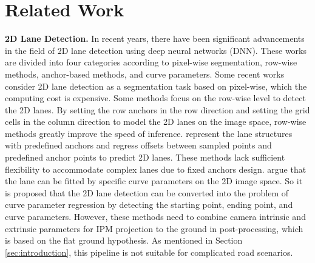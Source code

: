 \documentclass[10pt,twocolumn,letterpaper]{article}
\begin{document}
\section{Related Work} \label{sec:related}



\textbf{2D Lane Detection.}
In recent years, there have been significant advancements in the field of 2D lane detection using deep neural networks (DNN). These works are divided into four categories according to pixel-wise segmentation, row-wise methods, anchor-based methods, and curve parameters. Some recent works \cite{pan2018spatial,zheng2021resa,li2021hdmapnet,neven2018towards} consider 2D lane detection as a segmentation task based on pixel-wise, which the computing cost is expensive. Some methods \cite{qin2020ultra,liu2021condlanenet,yoo2020end} focus on the row-wise level to detect the 2D lanes. By setting the row anchors in the row direction and setting the grid cells in the column direction to model the 2D lanes on the image space, row-wise methods greatly improve the speed of inference. \cite{tabelini2021keep, su2021structure} represent the lane structures with predefined anchors and regress offsets between sampled points and predefined anchor points to predict 2D lanes. These methods lack sufficient flexibility to accommodate complex lanes due to fixed anchors design.
\cite{feng2022rethinking,tabelini2021polylanenet} argue that the lane can be fitted by specific curve parameters on the 2D image space. So it is proposed that the 2D lane detection can be converted into the problem of curve parameter regression by detecting the starting point, ending point, and curve parameters. However, these methods need to combine camera intrinsic and extrinsic parameters for IPM projection to the ground in post-processing, which is based on the flat ground hypothesis. As mentioned in Section \ref{sec:introduction}, this pipeline is not suitable for complicated road scenarios.
\end{document}
